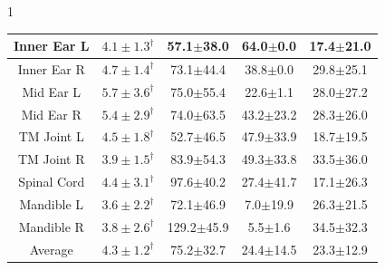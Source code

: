 \begin{table}[t!]
{\begin{subtable}{1\linewidth}
{\begin{tabular}{ccccc}
        Inner Ear L & $\bm{4.1\pm1.3^\dagger}$ & 57.1$\pm$38.0 & 64.0$\pm$0.0 & 17.4$\pm$21.0  \\ \hline
        Inner Ear R & $\bm{4.7\pm1.4^\dagger}$ & 73.1$\pm$44.4 & 38.8$\pm$0.0 & 29.8$\pm$25.1  \\ \hline
        Mid Ear L & $\bm{5.7\pm3.6^\dagger}$ & 75.0$\pm$55.4 & 22.6$\pm$1.1 & 28.0$\pm$27.2  \\ \hline
        Mid Ear R & $\bm{5.4\pm2.9^\dagger}$ & 74.0$\pm$63.5 & 43.2$\pm$23.2 & 28.3$\pm$26.0  \\ \hline
        TM Joint L & $\bm{4.5\pm1.8^\dagger}$ & 52.7$\pm$46.5 & 47.9$\pm$33.9 & 18.7$\pm$19.5  \\ \hline
        TM Joint R & $\bm{3.9\pm1.5^\dagger}$ & 83.9$\pm$54.3 & 49.3$\pm$33.8 & 33.5$\pm$36.0  \\ \hline
        Spinal Cord & $\bm{4.4\pm3.1^\dagger}$ & 97.6$\pm$40.2 & 27.4$\pm$41.7 & 17.1$\pm$26.3  \\ \hline
        Mandible L & $\bm{3.6\pm2.2^\dagger}$ & 72.1$\pm$46.9 & 7.0$\pm$19.9 & 26.3$\pm$21.5  \\ \hline
        Mandible R & $\bm{3.8\pm2.6^\dagger}$ & 129.2$\pm$45.9 & 5.5$\pm$1.6 & 34.5$\pm$32.3 \\
        \hline
        Average & $\bm{4.3\pm1.2^\dagger}$ & 75.2$\pm$32.7 & 24.4$\pm$14.5 & 23.3$\pm$12.9\\
\bottomrule[1.5pt]
\end{tabular}}
\end{subtable}}%

\hfill


\end{table}
